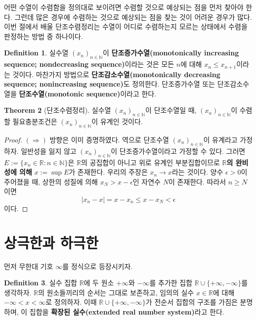 \documentclass[11pt]{book}
\numberwithin{equation}{chapter}
\def\NN{\mathbb{N}}
\def\RR{\mathbb{R}}
\def\eps{\epsilon}
\newcommand{\abs}[1]{\left\vert#1\right\vert}
\theoremstyle{definition}
\newtheorem{thm}{Theorem}[section]
\newtheorem{defn}[thm]{Definition}
\begin{document}
어떤 수열이 수렴함을 정의대로 보이려면 수렴할 것으로 예상되는 점을 먼저 찾아야 한다. 그런데 많은 경우에 수렴하는 것으로 예상되는 점을 찾는 것이 어려운 경우가 많다. 이번 절에서 배울 단조수렴정리는 수열이 어디로 수렴하는지 모르는 상태에서 수렴을 판정하는 방법 중 하나이다.

\begin{defn}
    실수열 \((x_n)_{n \in \NN}\)이 \textbf{단조증가수열(monotonically increasing sequence; nondecreasing sequence)}이라는 것은 모든 \(n\)에 대해 \(x_n \le x_{n+1}\)이라는 것이다. 마찬가지 방법으로 \textbf{단조감소수열(monotonically decreasing sequence; nonincreasing sequence)}도 정의한다. 단조증가수열 또는 단조감소수열을 \textbf{단조수열(monotonic sequence)}이라고 한다.
\end{defn}

\begin{thm} [단조수렴정리]
    실수열 \((x_n)_{n \in \NN}\)이 단조수열일 때, \((x_n)_{n \in \NN}\)이 수렴할 필요충분조건은 \((x_n)_{n \in \NN}\)이 유계인 것이다.
\end{thm}
\begin{proof}
    \((\Rightarrow)\) 방향은 이미 증명하였다. 역으로 단조수열 \((x_n)_{n \in \NN}\)이 유계라고 가정하자. 일반성을 잃지 않고 \((x_n)_{n \in \NN}\)이 단조증가수열이라고 가정할 수 있다. 그러면 \(E := \{x_n \in \RR : n \in \NN\}\)은 \(\RR\)의 공집합이 아니고 위로 유계인 부분집합이므로 \textbf{\(\RR\)의 완비성에 의해} \(x := \sup E\)가 존재한다. 우리의 주장은 \(x_n \to x\)라는 것이다. 양수 \(\eps > 0\)이 주어졌을 때, 상한의 성질에 의해 \(x_N > x - \eps\)인 자연수 \(N\)이 존재한다. 따라서 \(n \ge N\)이면
    \[
    \abs{x_n - x} = x - x_n \le x- x_N < \eps    
    \]
    이다.
\end{proof}

\section{상극한과 하극한}

먼저 무한대 기호 \(\infty\)를 정식으로 등장시키자.

\begin{defn}
    실수 집합 \(\RR\)에 두 원소 \(+\infty\)와 \(-\infty\)를 추가한 집합 \(\RR \cup \{+\infty, -\infty\}\)를 생각하자. \(\RR\)의 원소들끼리의 순서는 그대로 보존하고, 임의의 실수 \(x \in \RR\)에 대해 \(-\infty < x < \infty\)로 정의하자. 이때 \(\RR \cup \{+\infty, -\infty\}\)가 전순서 집합의 구조를 가짐은 분명하며, 이 집합을 \textbf{확장된 실수(extended real number system)}라고 한다.
\end{defn}
\end{document}
